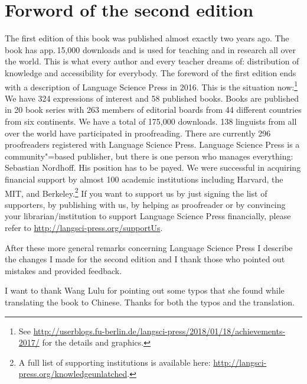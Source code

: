 
\section*{Forword of the second edition}

The first edition of this book was published almost exactly two years ago. The book has app.\,15,000
downloads and is used for teaching and in research all over the world. This is what every author and
every teacher dreams of: distribution of knowledge and accessibility for everybody. The foreword of
the first edition ends with a description of Language Science Press in 2016. This is the situation
now:\footnote{
  See \url{http://userblogs.fu-berlin.de/langsci-press/2018/01/18/achievements-2017/} for the
  details and graphics.
} We have 324 expressions of interest and 58 published books. Books are published in 20 book series with 263 members of editorial boards from 44
different countries from six continents. We have a total of 175,000 downloads. 138 linguists from
all over the world have participated in proofreading. There are currently 296 proofreaders
registered with Language Science Press. Language Science Press is a community"=based publisher, but
there is one person who manages everything: Sebastian Nordhoff. His
position has to be payed. We were successful in acquiring financial support by almost 100 academic institutions including 
Harvard, the MIT, and Berkeley.\footnote{
  A full list of supporting institutions is available here:
  \url{http://langsci-press.org/knowledgeunlatched}.
}
If you want to support us by just signing the list of supporters, by publishing with us, by helping as proofreader or by
convincing your librarian/institution to support Language Science Press financially, please refer to \url{http://langsci-press.org/supportUs}.



After these more general remarks concerning Language Science Press I describe the changes I made for the second edition and I
thank those who pointed out mistakes and provided feedback.

I want to thank Wang Lulu for pointing out some typos that she found while translating the book to
Chinese. Thanks for both the typos and the translation.


